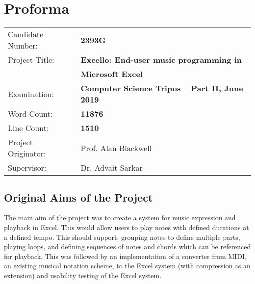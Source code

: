\newpage

\chapter*{Proforma}

{\large
\begin{tabular}{ll}
Candidate Number:   & \bf 2393G                                \\
Project Title:      & \bf Excello: End-user music programming in \\
                    & \bf Microsoft Excel \\
Examination:        & \bf Computer Science Tripos -- Part II, June 2019  \\
Word Count:         & \bf 11876\footnotemark[1]  \\
Line Count:         & \bf 1510\footnotemark[2]  \\
Project Originator: & Prof. Alan Blackwell                    \\
Supervisor:         & Dr. Advait Sarkar                    \\
\end{tabular}
}


\section*{Original Aims of the Project}

The main aim of the project was to create a system for music expression and playback in Excel. This would allow users to play notes with defined durations at a defined tempo. This should support: grouping notes to define multiple parts, playing loops, and defining sequences of notes and chords which can be referenced for playback. This was followed by an implementation of a converter from MIDI, an existing musical notation scheme, to the Excel system (with compression as an extension) and usability testing of the Excel system.

